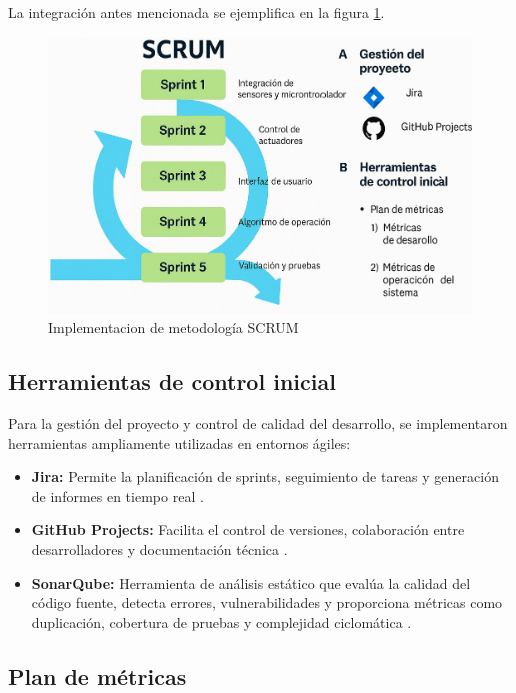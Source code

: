 \documentclass[conference]{IEEEtran}
\begin{document}
	La integración antes mencionada se ejemplifica en la figura \ref{fig:3}.
	
	\begin{figure}[htbp]
		\centering
		\includegraphics[width=\columnwidth]{fig3.jpg}
		\caption{Implementacion de metodología SCRUM}
		\label{fig:3}
	\end{figure}
	
	\subsection{Herramientas de control inicial}
	
	Para la gestión del proyecto y control de calidad del desarrollo, se implementaron herramientas ampliamente utilizadas en entornos ágiles:
	
	\begin{itemize}
		\item \textbf{Jira:} Permite la planificación de sprints, seguimiento de tareas y generación de informes en tiempo real \cite{b9}.
		\item \textbf{GitHub Projects:} Facilita el control de versiones, colaboración entre desarrolladores y documentación técnica \cite{b9}.
		\item \textbf{SonarQube:} Herramienta de análisis estático que evalúa la calidad del código fuente, detecta errores, vulnerabilidades y proporciona métricas como duplicación, cobertura de pruebas y complejidad ciclomática \cite{b10}.
	\end{itemize}
	
	\subsection{Plan de métricas}
	
\end{document}
